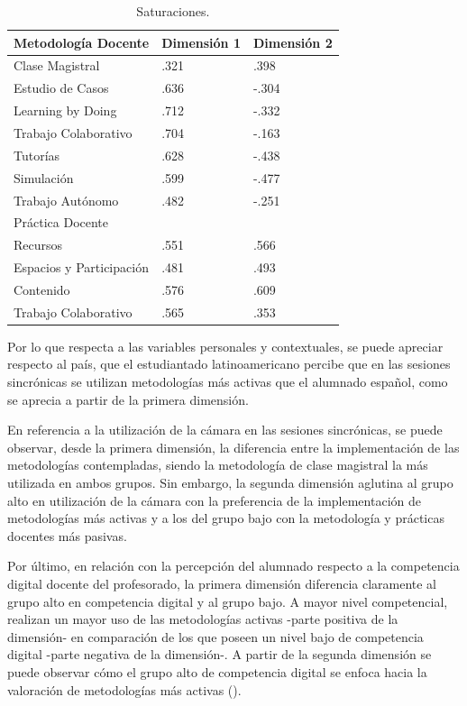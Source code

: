 \documentclass[spanish]{textolivre}
\begin{document}
\begin{table}[h!]
    \centering
    \begin{threeparttable}
    \caption{Saturaciones.}
    \label{tab08}
    \begin{tabular}{*{3}{l}}
    \toprule
    Metodología Docente & Dimensión 1 & Dimensión 2 \\
    \midrule
    Clase Magistral & .321 & .398 \\
    Estudio de Casos & .636 & -.304 \\
    Learning by Doing & .712 & -.332 \\
    Trabajo Colaborativo & .704 & -.163 \\
    Tutorías & .628 & -.438 \\
    Simulación & .599 & -.477 \\
    Trabajo Autónomo & .482 & -.251 \\
    \midrule
    Práctica Docente & & \\
    \midrule
    Recursos & .551 & .566 \\
    Espacios y Participación & .481 & .493 \\
    Contenido & .576 & .609 \\
    Trabajo Colaborativo & .565 & .353 \\
    \bottomrule
    \end{tabular}
    \end{threeparttable}
\end{table}

Por lo que respecta a las variables personales y contextuales, se puede apreciar respecto al país, que el estudiantado latinoamericano percibe que en las sesiones sincrónicas se utilizan metodologías más activas que el alumnado español, como se aprecia a partir de la primera dimensión.

En referencia a la utilización de la cámara en las sesiones sincrónicas, se puede observar, desde la primera dimensión, la diferencia entre la implementación de las metodologías contempladas, siendo la metodología de clase magistral la más utilizada en ambos grupos. Sin embargo, la segunda dimensión aglutina al grupo alto en utilización de la cámara con la preferencia de la implementación de metodologías más activas y a los del grupo bajo con la metodología y prácticas docentes más pasivas.

Por último, en relación con la percepción del alumnado respecto a la competencia digital docente del profesorado, la primera dimensión diferencia claramente al grupo alto en competencia digital y al grupo bajo. A mayor nivel competencial, realizan un mayor uso de las metodologías activas -parte positiva de la dimensión- en comparación de los que poseen un nivel bajo de competencia digital -parte negativa de la dimensión-. A partir de la segunda dimensión se puede observar cómo el grupo alto de competencia digital se enfoca hacia la valoración de metodologías más activas ().  
\end{document}
